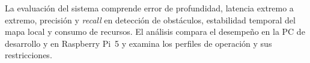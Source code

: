 La evaluación del sistema comprende error de profundidad, latencia extremo a extremo, precisión y
\textit{recall} en detección de obstáculos, estabilidad temporal del mapa local y consumo de
recursos. El análisis compara el desempeño en la PC de desarrollo y en Raspberry Pi~5 y examina
los perfiles de operación y sus restricciones.
